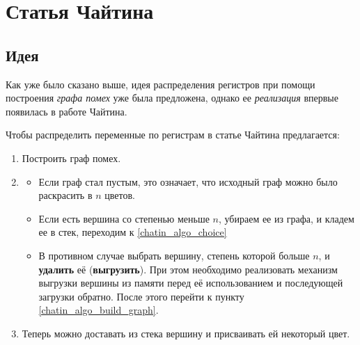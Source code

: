\documentclass[12pt]{article}
\begin{document}

\section{Статья Чайтина}
\subsection{Идея}
Как уже было сказано выше, идея распределения регистров при помощи построения \textit{графа помех} уже была
предложена, однако ее \textit{реализация} впервые появилась в работе Чайтина.

Чтобы распределить переменные по регистрам в статье Чайтина предлагается:

\begin{enumerate}
    \item Построить граф помех.\label{chatin_algo_build_graph}
    \item \label{chatin_algo_choice}\begin{itemize}
        \item Если граф стал пустым, это означает, что исходный граф можно было раскрасить в $n$ цветов.
        \item Если есть вершина со степенью меньше $n$, убираем ее из графа, и кладем ее в стек, переходим
        к \ref{chatin_algo_choice}
        \item В противном случае выбрать вершину, степень которой больше $n$, и \textbf{удалить} её (\textbf{выгрузить}).
        При этом необходимо реализовать механизм выгрузки вершины из памяти перед её использованием и
        последующей загрузки обратно. После этого перейти к пункту \ref{chatin_algo_build_graph}.
        \label{chatin_algo_spill}
    \end{itemize}

    \item Теперь можно доставать из стека вершину и присваивать ей некоторый цвет. \label{chatin_algo_color_assignment}
\end{enumerate}
\end{document}
